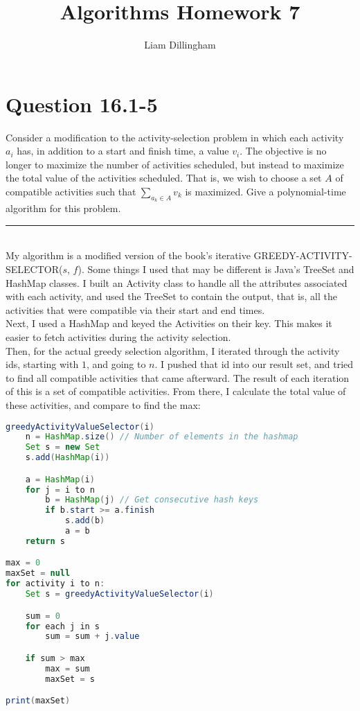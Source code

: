 \documentclass[20pt]{article} %
\title{Algorithms Homework 7}
\author{Liam Dillingham}
\begin{document}
\maketitle

\section{Question 16.1-5} 
Consider a modification to the activity-selection problem in which each activity $a_i$ has, in addition to a start and finish time, a value $v_i$. The objective is no longer to maximize the number of activities scheduled, but instead to maximize the total value of the activities scheduled.  That is, we wish to choose a set $A$ of compatible activities such that $\sum_{a_k \in A}^{} v_k$ is maximized. Give a polynomial-time algorithm for this problem. \\ 
\noindent\rule{2cm}{0.4pt} \\

My algorithm is a modified version of the book's iterative GREEDY-ACTIVITY-SELECTOR($s$, $f$).  Some things I used that may be different is Java's TreeSet and HashMap classes. I built an Activity class to handle all the attributes associated with each activity, and used the TreeSet to contain the output, that is, all the activities that were compatible via their start and end times.\\

Next, I used a HashMap and keyed the Activities on their key.  This makes it easier to fetch activities during the activity selection. \\

Then, for the actual greedy selection algorithm, I iterated through the activity ids, starting with $1$, and going to $n$.  I pushed that id into our result set, and tried to find all compatible activities that came afterward. The result of each iteration of this is a set of compatible activities.  From there, I calculate the total value of these activities, and compare to find the max:

\newpage
\begin{lstlisting}[language=java]
greedyActivityValueSelector(i)
	n = HashMap.size() // Number of elements in the hashmap
	Set s = new Set
	s.add(HashMap(i))

	a = HashMap(i) 
	for j = i to n
		b = HashMap(j) // Get consecutive hash keys
		if b.start >= a.finish
			s.add(b)
			a = b
	return s

max = 0
maxSet = null
for activity i to n:
	Set s = greedyActivityValueSelector(i)

	sum = 0
	for each j in s
		sum = sum + j.value

	if sum > max
		max = sum
		maxSet = s

print(maxSet)

\end{lstlisting}
\end{document}
